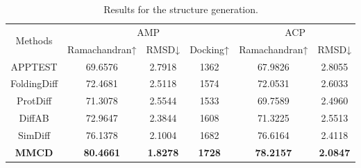 \documentclass[letterpaper]{article} %
\begin{document}
\begin{table}[ht]
\centering
\setlength{\tabcolsep}{16pt}
\begin{tabular}{cccccc}
\hline
\multirow{2}{*}{Methods} & \multicolumn{3}{c}{AMP}                            & \multicolumn{2}{c}{ACP} 
\\ \cmidrule(r){2-4} \cmidrule(r){5-6}
                         & Ramachandran↑    & RMSD↓           & Docking↑        & Ramachandran↑  & RMSD↓  \\ \hline
APPTEST                  & 69.6576          & 2.7918          & 1362            & 67.9826        & 2.8055 \\
FoldingDiff              & 72.4681          & 2.5118          & 1574            & 72.0531        & 2.6033 \\
ProtDiff                 & 71.3078          & 2.5544          & 1533            & 69.7589        & 2.4960 \\
DiffAB                   & 72.9647          & 2.3844          & 1608            & 71.3225        & 2.5513 \\
SimDiff                  & 76.1378          & 2.1004          & 1682            & 76.6164        & 2.4118 \\ 
\textbf{MMCD}            & \textbf{80.4661} & \textbf{1.8278} & \textbf{1728}   & \textbf{78.2157}        & \textbf{2.0847} \\ \hline
\end{tabular}
\caption{Results for the structure generation.} 
\end{table}
\end{document}
